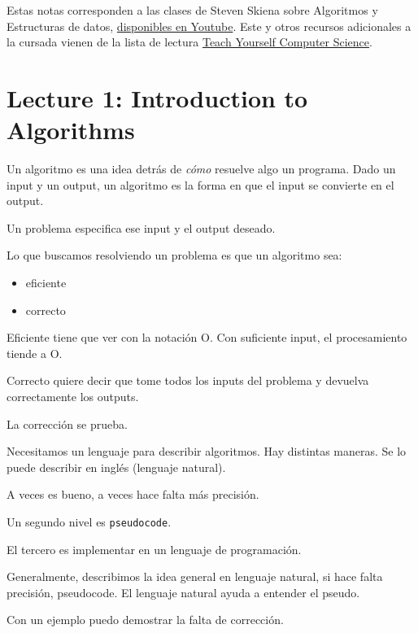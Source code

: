 
Estas notas corresponden a las clases de Steven Skiena 
sobre Algoritmos y Estructuras de datos, 
\href{https://www.youtube.com/watch?v=22hwcnXIGgk&list=PLOtl7M3yp-DX6ic0HGT0PUX_wiNmkWkXx}{disponibles en Youtube}.
Este y otros recursos adicionales a la cursada vienen de la lista de lectura
 \href{https://teachyourselfcs.com/}{Teach Yourself Computer Science}.

\section{Lecture 1: Introduction to Algorithms}

Un algoritmo es una idea detrás de \textit{cómo} resuelve algo un programa.
Dado un input y un output,
un algoritmo es la forma en que el input se convierte en el output.

Un problema especifica ese input y el output deseado.

Lo que buscamos resolviendo un problema es que un algoritmo sea:
\begin{itemize}
    \item eficiente
    \item correcto
\end{itemize}

Eficiente tiene que ver con la notación O.
Con suficiente input, 
el procesamiento tiende a O.

Correcto quiere decir que tome todos los inputs del problema y 
devuelva correctamente los outputs. 

La corrección se prueba.

Necesitamos un lenguaje para describir algoritmos.
Hay distintas maneras.
Se lo puede describir en inglés (lenguaje natural).

A veces es bueno, a veces hace falta más precisión.

Un segundo nivel es \texttt{pseudocode}.

El tercero es implementar en un lenguaje de programación.

Generalmente,
describimos la idea general en lenguaje natural,
si hace falta precisión, pseudocode.
El lenguaje natural ayuda a entender el pseudo.

Con un ejemplo puedo demostrar la falta de corrección.